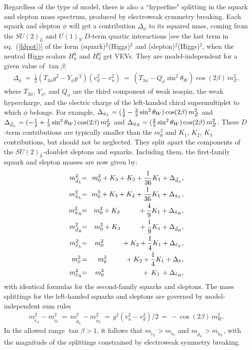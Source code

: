 \documentclass[12pt]{article}
\def\beq{\begin{eqnarray}}
\def\eeq{\end{eqnarray}}
\begin{document}
Regardless of the type of model,
there is also a ``hyperfine" splitting in the squark and slepton mass 
spectrum, produced by electroweak symmetry breaking. Each squark and 
slepton $\phi$ will get a contribution $\Delta_\phi$ to its squared mass, 
coming from the $SU(2)_L$ and $U(1)_Y$ $D$-term quartic interactions [see 
the last term in eq.~(\ref{fdpot})] of the form (squark)$^2$(Higgs)$^2$ 
and (slepton)$^2$(Higgs)$^2$, when the neutral Higgs scalars $H_u^0$ and 
$H_d^0$ get VEVs. They are model-independent for a given value of 
$\tan\beta$:
\beq
\Delta_\phi \>=\> \frac{1}{2}
(T_{3\phi} g^2 - Y_\phi g^{\prime 2}) (v_d^2 - v_u^2) \>=\> 
(T_{3\phi} - Q_\phi\sin^2\theta_W)
\cos (2\beta)\, m_Z^2 ,
\label{defDeltaphi}
\eeq
where $T_{3\phi}$, $Y_\phi$, and $Q_\phi$ are the third component of weak 
isospin, the weak hypercharge, and the electric charge of the left-handed 
chiral supermultiplet to which $\phi$ belongs. For example, 
$\Delta_{\tilde u_L} = ({1\over 2} - {2\over 3} \sin^2\theta_W)\cos 
(2\beta)\, m_Z^2$ and $\Delta_{\tilde d_L} = (-{1\over 2} + {1\over 3} 
\sin^2\theta_W)\cos (2\beta)\, m_Z^2$ and $\Delta_{\tilde u_R} = ({2\over 
3} \sin^2\theta_W)\cos (2\beta) \, m_Z^2$. These $D$-term contributions 
are typically smaller than the $m_0^2$ and $K_1$, $K_2$, $K_3$ 
contributions, but should not be neglected. They split apart the 
components of the $SU(2)_L$-doublet sleptons and squarks. Including them, 
the first-family squark and slepton masses are now given by:
\beq
m_{\tilde d_L}^2 \!\!&=&\!\! m_0^2 + K_3 + K_2 + {1\over 36} K_1 +
\Delta_{\tilde d_L},
\label{msdlform}
\\
m_{\tilde u_L}^2 \!\!&=&\!\! m_0^2 + K_3 + K_2 + {1\over 36} K_1 +
\Delta_{\tilde u_L},
\\
m_{\tilde u_R}^2\!\! &=&\!\! m_0^2 + K_3 \qquad\>\>\>  + {4\over 9} K_1 +
\Delta_{\tilde u_R},
\\
m_{\tilde d_R}^2 \!\!&=&\!\! m_0^2 + K_3 \qquad\>\>\>  + {1\over 9} K_1 +
\Delta_{\tilde d_R},
\label{msdrform}
\\
m_{\tilde e_L}^2 \!\!&=&\!\! m_0^2 \qquad\>\>\> + K_2 + {1\over 4} K_1 +
\Delta_{\tilde e_L},
\label{mselform}
\\
m_{\tilde \nu}^2 \!&=& \!\! m_0^2 \qquad\>\>\> + K_2 + {1\over 4} K_1 +
\Delta_{\tilde \nu},
\\
m_{\tilde e_R}^2 \!\!&=&\!\! m_0^2 \qquad\qquad\>\>\>\>\>\> \, +\,
K_1
\, + \Delta_{\tilde e_R},
\label{mserform}
\eeq
with identical formulas for the second-family squarks and sleptons. The 
mass splittings for the left-handed squarks and sleptons are governed by 
model-independent sum rules
\beq
m_{\tilde e_L}^2 -m_{\tilde \nu_e}^2 \,=\, 
m_{\tilde d_L}^2 -m_{\tilde u_L}^2 \,=\, 
g^2 (v_u^2 - v_d^2)/2 \,=\,  -\cos (2\beta)\, m_W^2  .
\eeq
In the allowed range $\tan\beta>1$, it follows that $m_{\tilde e_L} > 
m_{\tilde \nu_e}$ and $m_{\tilde d_L} > m_{\tilde u_L}$, with the 
magnitude of the splittings constrained by electroweak symmetry breaking.
\end{document}
